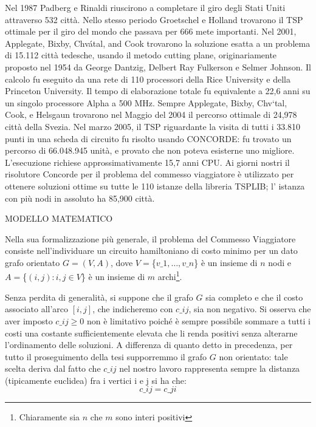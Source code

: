 \documentclass[11pt]{article}
\begin{document}
Nel 1987  Padberg e Rinaldi riuscirono a completare il giro degli Stati Uniti attraverso 532 citt\`a. Nello stesso periodo Groetschel e Holland trovarono il TSP ottimale per il giro del mondo che passava per 666 mete importanti. 
Nel 2001, Applegate, Bixby, Chvátal, and Cook trovarono la soluzione esatta a un problema di 15.112 citt\`a tedesche, usando il metodo cutting plane, originariamente proposto nel 1954 da George Dantzig, Delbert Ray Fulkerson e Selmer Johnson. Il calcolo fu eseguito da una rete di 110 processori della Rice University e della Princeton University. Il tempo di elaborazione totale fu equivalente a 22,6 anni su un singolo processore Alpha a 500 MHz.
Sempre Applegate, Bixby, Chv\a`tal, Cook, e Helsgaun trovarono nel Maggio del 2004 il percorso ottimale di 24,978 citt\`a della Svezia. 
Nel marzo 2005, il TSP riguardante la visita di tutti i 33.810 punti in una scheda di circuito fu risolto usando CONCORDE: fu trovato un percorso di 66.048.945 unit\`a, e provato che non poteva esisterne uno migliore. L'esecuzione richiese approssimativamente 15,7 anni CPU. 
Ai giorni nostri il risolutore Concorde per il problema del commesso viaggiatore \`e utilizzato per ottenere soluzioni ottime su tutte le 110 istanze della libreria TSPLIB; l' istanza con pi\`u nodi in assoluto ha 85,900 citt\`a. 

\vspace{2\baselineskip}

MODELLO MATEMATICO
\vspace{2\baselineskip}

Nella sua formalizzazione pi\`u generale, il problema del Commesso Viaggiatore consiste nell'individuare un circuito hamiltoniano di costo minimo per un dato grafo orientato $G=(V,A)$, dove $V = $\{$ {v\_1,\dots,v\_n} $\}$ $ \`e un insieme di $n$ nodi e $A = $\{$ {(i,j): i, j \in V} $\}$ $ \`e un insieme di $m$ archi\footnote{Chiaramente sia $n$ che $m$ sono interi positivi}. 

Senza perdita di generalit\`a, si suppone che il grafo $G$ sia completo e che il costo associato all'arco $[i,j]$, che indicheremo con $c\_{ij}$, sia non negativo. Si osserva che aver imposto $c\_{ij} \ge 0$ non \`e limitativo poich\'e \`e sempre possibile sommare a tutti i costi una costante sufficientemente elevata che li renda positivi senza alterarne l'ordinamento delle soluzioni. 
A differenza di quanto detto in precedenza, per tutto il proseguimento della tesi supporremmo il grafo $G$ non orientato: tale scelta deriva dal fatto che $c\_{ij}$ nel nostro lavoro rappresenta sempre la distanza (tipicamente euclidea) fra i vertici i e j si ha che:
$$c\_{ij} = c\_{ji}$$
\end{document}
